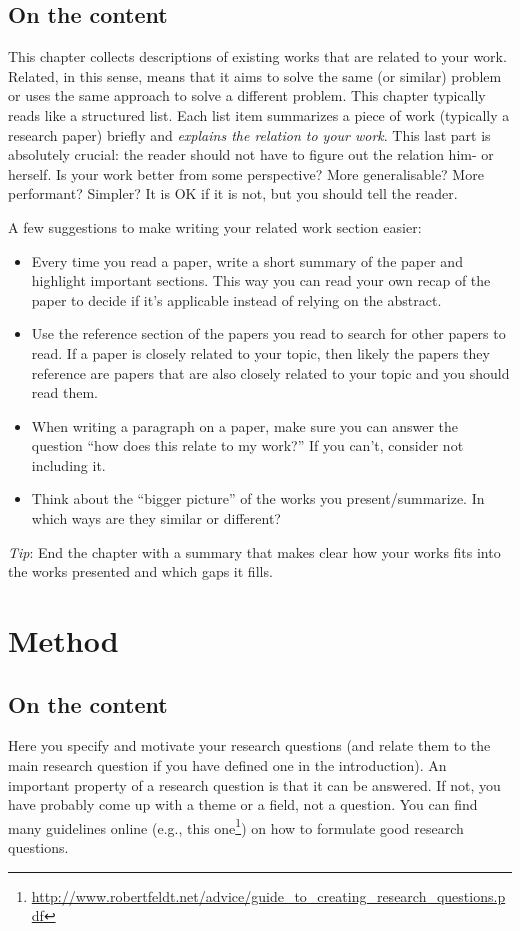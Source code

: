 \documentclass[a4paper,twoside]{bth}
\begin{document}
\section{On the content}
This chapter collects descriptions of existing works that are related to your work. Related, in this sense, means that it aims to solve the same (or similar) problem or uses the same approach to solve a different problem. This chapter typically reads like a structured list. Each list item summarizes a piece of work (typically a research paper) briefly and \emph{explains the relation to your work}. This last part is absolutely crucial: the reader should not have to figure out the relation him- or herself. Is your work better from some perspective? More generalisable? More performant? Simpler? It is OK if it is not, but you should tell the reader.

A few suggestions to make writing your related work section easier:
\begin{itemize}
    \item Every time you read a paper, write a short summary of the paper and highlight important sections. This way you can read your own recap of the paper to decide if it's applicable instead of relying on the abstract.
    \item Use the reference section of the papers you read to search for other papers to read. If a paper is closely related to your topic, then likely the papers they reference are papers that are also closely related to your topic and you should read them.
    \item When writing a paragraph on a paper, make sure you can answer the question ``how does this relate to my work?'' If you can't, consider not including it.
    \item Think about the ``bigger picture'' of the works you present/summarize. In which ways are they similar or different?
\end{itemize}

\emph{Tip}: End the chapter with a summary that makes clear how your works fits into the works presented and which gaps it fills.

\chapter{Method}
\label{chp:method}
\section{On the content}
Here you specify and motivate your research questions (and relate them to the main research question if you have defined one in the introduction). An important property of a research question is that it can be answered. If not, you have probably come up with a theme or a field, not a question. You can find many guidelines online (e.g., this one\footnote{\url{http://www.robertfeldt.net/advice/guide_to_creating_research_questions.pdf}}) on how to formulate good research questions.
\end{document}
